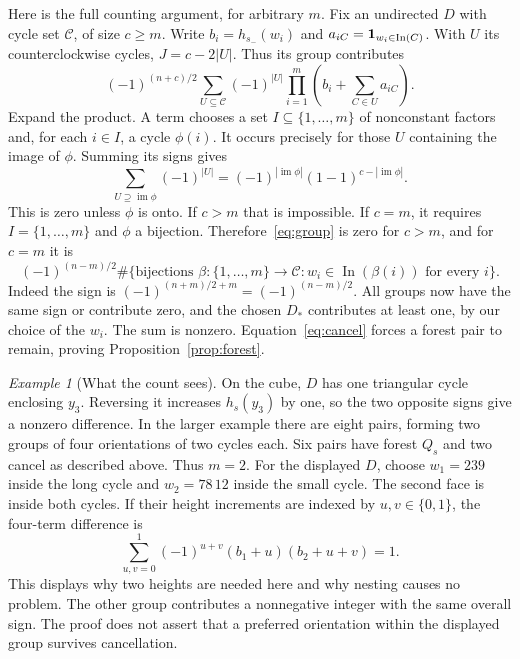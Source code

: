 \documentclass[10pt,a4paper]{amsart}
\theoremstyle{remark}
\newtheorem*{example}{Example}
\newcommand{\In}{\operatorname{In}}
\begin{document}
Here is the full counting argument, for arbitrary $m$. Fix an undirected $D$ with cycle set $\mathcal C$, of size $c\geq m$. Write $b_i=h_{s_-}(w_i)$ and $a_{iC}={\bf1}_{w_i\in\In(C)}$. With $U$ its counterclockwise cycles, $J=c-2|U|$. Thus its group contributes
\begin{equation}\label{eq:group}
 (-1)^{(n+c)/2}\sum_{U\subseteq\mathcal C}(-1)^{|U|}
       \prod_{i=1}^m\left(b_i+\sum_{C\in U}a_{iC}\right).
\end{equation}
Expand the product. A term chooses a set $I\subseteq\{1,\ldots,m\}$ of nonconstant factors and, for each $i\in I$, a cycle $\phi(i)$. It occurs precisely for those $U$ containing the image of $\phi$. Summing its signs gives
\[
 \sum_{U\supseteq\operatorname{im}\phi}(-1)^{|U|}
 =(-1)^{|\operatorname{im}\phi|}(1-1)^{c-|\operatorname{im}\phi|}.
\]
This is zero unless $\phi$ is onto. If $c>m$ that is impossible. If $c=m$, it requires $I=\{1,\ldots,m\}$ and $\phi$ a bijection. Therefore~\eqref{eq:group} is zero for $c>m$, and for $c=m$ it is
\begin{equation}\label{eq:positive}
 (-1)^{(n-m)/2}
 \#\{\text{bijections }\beta:\{1,\ldots,m\}\to\mathcal C:
                         w_i\in\In(\beta(i))\text{ for every }i\}.
\end{equation}
Indeed the sign is $(-1)^{(n+m)/2+m}=(-1)^{(n-m)/2}$. All groups now have the same sign or contribute zero, and the chosen $D_*$ contributes at least one, by our choice of the $w_i$. The sum is nonzero. Equation~\eqref{eq:cancel} forces a forest pair to remain, proving Proposition~\ref{prop:forest}.

\begin{example}[What the count sees]
On the cube, $D$ has one triangular cycle enclosing $y_3$. Reversing it increases $h_s(y_3)$ by one, so the two opposite signs give a nonzero difference.
In the larger example there are eight pairs, forming two groups of four orientations of two cycles each. Six pairs have forest $Q_s$ and two cancel as described above. Thus $m=2$. For the displayed $D$, choose $w_1=239$ inside the long cycle and $w_2=78\,12$ inside the small cycle. The second face is inside both cycles. If their height increments are indexed by $u,v\in\{0,1\}$, the four-term difference is
\[
 \sum_{u,v=0}^1(-1)^{u+v}(b_1+u)(b_2+u+v)=1.
\]
This displays why two heights are needed here and why nesting causes no problem. The other group contributes a nonnegative integer with the same overall sign. The proof does not assert that a preferred orientation within the displayed group survives cancellation.
\end{example}
\end{document}
